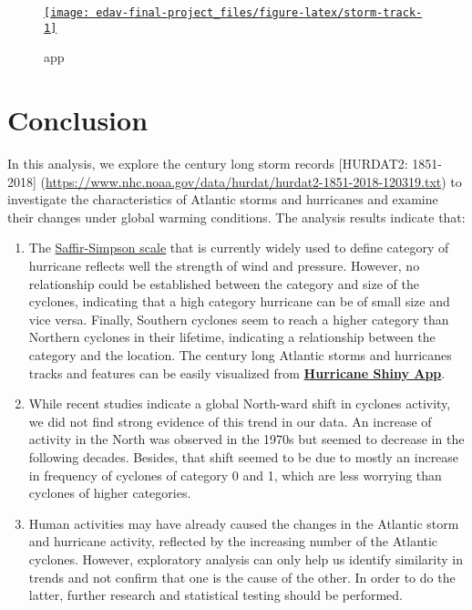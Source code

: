\documentclass[]{book}
\begin{document}
\begin{figure}

{\centering \href{https://hurricane.shinyapps.io/01_01/}{\texttt{[image: edav-final-project\_files/figure-latex/storm-track-1]} }

}

\caption{app}\label{fig:storm-track}
\end{figure}

\hypertarget{conclusion}{%
\chapter{Conclusion}\label{conclusion}}

In this analysis, we explore the century long storm records {[}HURDAT2: 1851-2018{]} (\url{https://www.nhc.noaa.gov/data/hurdat/hurdat2-1851-2018-120319.txt}) to investigate the characteristics of Atlantic storms and hurricanes and examine their changes under global warming conditions. The analysis results indicate that:

\begin{enumerate}
\def\labelenumi{(\arabic{enumi})}
\item
  The \href{https://www.nhc.noaa.gov/aboutsshws.php}{Saffir-Simpson scale} that is currently widely used to define category of hurricane reflects well the strength of wind and pressure. However, no relationship could be established between the category and size of the cyclones, indicating that a high category hurricane can be of small size and vice versa. Finally, Southern cyclones seem to reach a higher category than Northern cyclones in their lifetime, indicating a relationship between the category and the location. The century long Atlantic storms and hurricanes tracks and features can be easily visualized from \href{https://hurricane.shinyapps.io/01_01/}{\textbf{Hurricane Shiny App}}.
\item
  While recent studies indicate a global North-ward shift in cyclones activity, we did not find strong evidence of this trend in our data. An increase of activity in the North was observed in the 1970s but seemed to decrease in the following decades. Besides, that shift seemed to be due to mostly an increase in frequency of cyclones of category 0 and 1, which are less worrying than cyclones of higher categories.
\item
  Human activities may have already caused the changes in the Atlantic storm and hurricane activity, reflected by the increasing number of the Atlantic cyclones. However, exploratory analysis can only help us identify similarity in trends and not confirm that one is the cause of the other. In order to do the latter, further research and statistical testing should be performed.
\end{enumerate}


\end{document}
